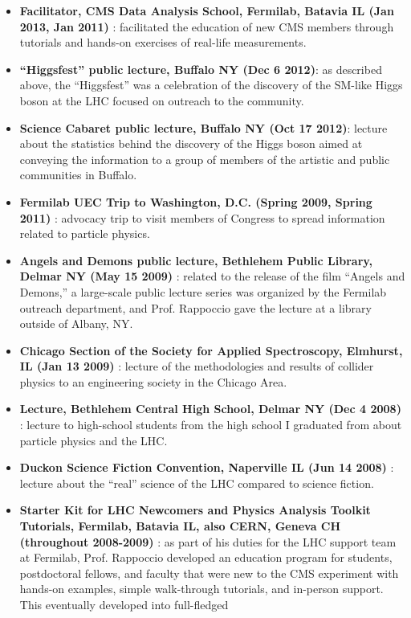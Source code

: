 \documentclass[12pt]{proposalnsf}
\begin{document}
\begin{itemize}
\item {\bf Facilitator, CMS Data Analysis School, Fermilab, Batavia IL
  (Jan 2013, Jan 2011)} : facilitated the education of new CMS members
through tutorials and hands-on exercises of real-life
measurements. 
\item {\bf ``Higgsfest'' public lecture, Buffalo NY (Dec 6 2012)}: as
  described above, the ``Higgsfest'' was a celebration of the
  discovery of the SM-like Higgs boson at the LHC focused on outreach
  to the community. 
\item {\bf Science Cabaret public lecture, Buffalo NY (Oct 17 2012)}:
  lecture about the statistics behind the discovery of the Higgs boson
  aimed at conveying the information to a group of members of the
  artistic and public communities in Buffalo. 
\item {\bf Fermilab UEC Trip to Washington, D.C. (Spring 2009, Spring
    2011)} : advocacy trip to visit members of Congress to
  spread information related to particle physics. 
\item {\bf Angels and Demons public lecture, Bethlehem Public Library,
    Delmar NY (May 15 2009)} : related to the release of the film
  ``Angels and Demons,'' a large-scale public lecture series was
  organized by the Fermilab outreach department, and Prof. Rappoccio gave the
  lecture at a library outside of Albany, NY. 
\item {\bf Chicago Section of the Society for Applied Spectroscopy,
    Elmhurst, IL (Jan 13 2009)} : lecture of the methodologies and
  results of collider physics to an engineering society in the Chicago
  Area. 
\item {\bf Lecture, Bethlehem Central High School,
    Delmar NY (Dec 4 2008)} : lecture to high-school students from the
  high school I graduated from about particle physics and the LHC. 
\item {\bf Duckon Science Fiction Convention, Naperville IL (Jun 14
    2008)} : lecture about the ``real'' science of the LHC compared to
  science fiction. 
\item {\bf Starter Kit for LHC Newcomers and Physics Analysis Toolkit
    Tutorials, Fermilab, Batavia IL, also CERN, Geneva CH (throughout
    2008-2009)} : as part of his duties for the LHC support team at
  Fermilab, Prof. Rappoccio developed an education program for students,
  postdoctoral fellows, and faculty that were new to the CMS
  experiment with hands-on examples, simple walk-through tutorials,
  and in-person support. This eventually developed into full-fledged

\end{itemize}
\end{document}

